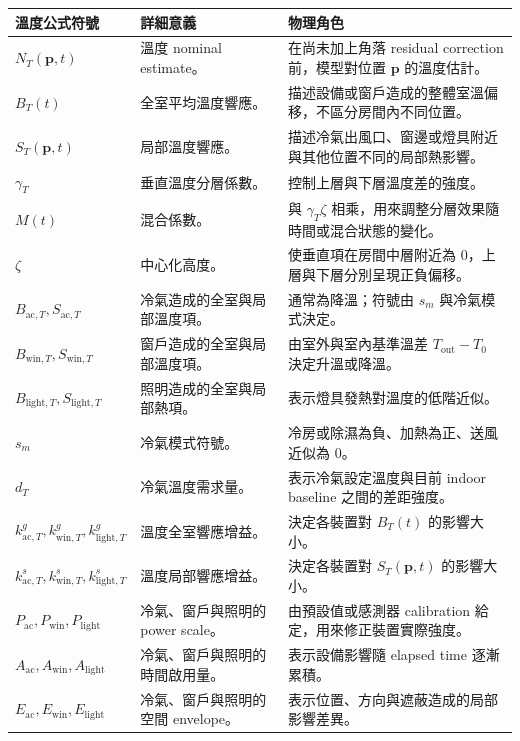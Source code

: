 \documentclass[12pt,a4paper]{article}
\begin{document}
\begin{table}[htbp]
\centering
\footnotesize
\renewcommand{\arraystretch}{1.25}
\begin{tabular}{|>{\raggedright\arraybackslash}p{}|>{\raggedright\arraybackslash}p{}|>{\raggedright\arraybackslash}p{}|}
\hline
\textbf{溫度公式符號} & \textbf{詳細意義} & \textbf{物理角色} \\
\hline
$N_T(\mathbf{p},t)$ & 溫度 nominal estimate。 & 在尚未加上角落 residual correction 前，模型對位置 $\mathbf{p}$ 的溫度估計。 \\
\hline
$B_T(t)$ & 全室平均溫度響應。 & 描述設備或窗戶造成的整體室溫偏移，不區分房間內不同位置。 \\
\hline
$S_T(\mathbf{p},t)$ & 局部溫度響應。 & 描述冷氣出風口、窗邊或燈具附近與其他位置不同的局部熱影響。 \\
\hline
$\gamma_T$ & 垂直溫度分層係數。 & 控制上層與下層溫度差的強度。 \\
\hline
$M(t)$ & 混合係數。 & 與 $\gamma_T\zeta$ 相乘，用來調整分層效果隨時間或混合狀態的變化。 \\
\hline
$\zeta$ & 中心化高度。 & 使垂直項在房間中層附近為 0，上層與下層分別呈現正負偏移。 \\
\hline
$B_{\mathrm{ac},T},S_{\mathrm{ac},T}$ & 冷氣造成的全室與局部溫度項。 & 通常為降溫；符號由 $s_m$ 與冷氣模式決定。 \\
\hline
$B_{\mathrm{win},T},S_{\mathrm{win},T}$ & 窗戶造成的全室與局部溫度項。 & 由室外與室內基準溫差 $T_{\mathrm{out}}-T_0$ 決定升溫或降溫。 \\
\hline
$B_{\mathrm{light},T},S_{\mathrm{light},T}$ & 照明造成的全室與局部熱項。 & 表示燈具發熱對溫度的低階近似。 \\
\hline
$s_m$ & 冷氣模式符號。 & 冷房或除濕為負、加熱為正、送風近似為 0。 \\
\hline
$d_T$ & 冷氣溫度需求量。 & 表示冷氣設定溫度與目前 indoor baseline 之間的差距強度。 \\
\hline
$k_{\mathrm{ac},T}^{g},k_{\mathrm{win},T}^{g},k_{\mathrm{light},T}^{g}$ & 溫度全室響應增益。 & 決定各裝置對 $B_T(t)$ 的影響大小。 \\
\hline
$k_{\mathrm{ac},T}^{s},k_{\mathrm{win},T}^{s},k_{\mathrm{light},T}^{s}$ & 溫度局部響應增益。 & 決定各裝置對 $S_T(\mathbf{p},t)$ 的影響大小。 \\
\hline
$P_{\mathrm{ac}},P_{\mathrm{win}},P_{\mathrm{light}}$ & 冷氣、窗戶與照明的 power scale。 & 由預設值或感測器 calibration 給定，用來修正裝置實際強度。 \\
\hline
$A_{\mathrm{ac}},A_{\mathrm{win}},A_{\mathrm{light}}$ & 冷氣、窗戶與照明的時間啟用量。 & 表示設備影響隨 elapsed time 逐漸累積。 \\
\hline
$E_{\mathrm{ac}},E_{\mathrm{win}},E_{\mathrm{light}}$ & 冷氣、窗戶與照明的空間 envelope。 & 表示位置、方向與遮蔽造成的局部影響差異。 \\
\hline
\end{tabular}
\end{table}
\end{document}
